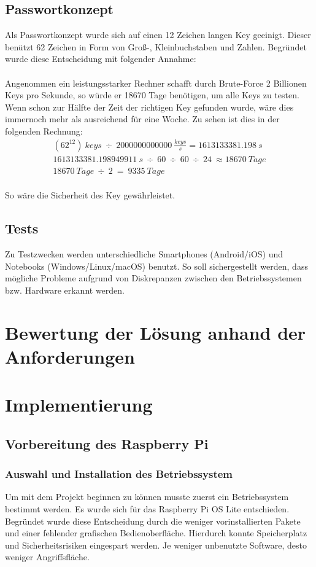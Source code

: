 \documentclass[a4paper,11pt,singlespacing]{article}
\begin{document}
		\subsection{Passwortkonzept}
			Als Passwortkonzept wurde sich auf einen 12 Zeichen langen Key geeinigt. Dieser benützt 62 Zeichen in Form von Groß-, Kleinbuchstaben und Zahlen. Begründet wurde diese Entscheidung mit folgender Annahme: \\\\
			Angenommen ein leistungsstarker Rechner schafft durch Brute-Force 2 Billionen Keys pro Sekunde, so würde er 18670 Tage benötigen, um alle Keys zu testen.  Wenn schon zur Hälfte der Zeit der richtigen Key gefunden wurde, wäre dies immernoch mehr als ausreichend für eine Woche. Zu sehen ist dies in der folgenden Rechnung:
			\begin{eqnarray}
				(62^{12})\ keys\ \div\ 2000000000000\ \frac{keys}{s} =  1613133381.198\ s\\
				1613133381.198949911\ s\ \div\ 60\ \div\ 60\ \div\ 24\ \approx 18670 \ Tage\\
				18670\ Tage\ \div\ 2\ =\ 9335\ Tage
			\end{eqnarray}\\
		    So wäre die Sicherheit des Key gewährleistet.
	
		\subsection{Tests}
			Zu Testzwecken werden unterschiedliche Smartphones (Android/iOS) und Notebooks (Windows/Linux/macOS) benutzt. So soll sichergestellt werden, dass mögliche Probleme aufgrund von Diskrepanzen zwischen den Betriebssystemen bzw. Hardware erkannt werden.
		
		
	  \section{Bewertung der Lösung anhand der Anforderungen}
    	
    
    	\section{Implementierung}
    	\subsection{Vorbereitung des Raspberry Pi}
    	\subsubsection{Auswahl und Installation des Betriebssystem}
    	    Um mit dem Projekt beginnen zu können musste zuerst ein Betriebssystem bestimmt werden.
        	Es wurde sich für das Raspberry Pi OS Lite entschieden. Begründet wurde diese Entscheidung  durch die weniger vorinstallierten Pakete und einer fehlender grafischen Bedienoberfläche. Hierdurch konnte Speicherplatz und Sicherheitsrisiken eingespart werden. Je weniger unbenutzte Software, desto weniger Angriffsfläche. \\ 
    	
\end{document}
